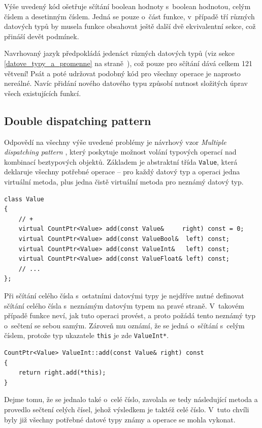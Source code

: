 \documentclass[11pt,twoside,a4paper]{book}
\begin{document}
Výše uvedený kód ošetřuje sčítání boolean hodnoty s~boolean hodnotou, celým číslem a desetinným číslem. Jedná se pouze o~část funkce, v~případě tří různých datových typů by musela funkce obsahovat ještě další dvě ekvivalentní sekce, což přináší devět podmínek.

Navrhovaný jazyk předpokládá jedenáct různých datových typů (viz sekce \ref{datove_typy_a_promenne} na straně~\pageref{datove_typy_a_promenne}), což pouze pro sčítání dává celkem 121 větvení! Psát a poté udržovat podobný kód pro všechny operace je naprosto nereálné. Navíc přidání nového datového typu způsobí nutnost slo\-ži\-tých úprav všech existujících funkcí.


\subsection{Double dispatching pattern}
\label{double_dispatching_pattern}

Odpovědí na všechny výše uvedené problémy je návrhový vzor \textit{Multiple dispatching pattern} \cite[str. 679]{eckel}, který poskytuje možnost volání typových operací nad kombinací beztypových objektů. Základem je abstraktní třída \texttt{Value}, která deklaruje všechny potřebné operace -- pro každý datový typ a operaci jedna virtuální metoda, plus jedna čistě virtuální metoda pro neznámý datový typ.

\begin{verbatim}
class Value
{
    // +
    virtual CountPtr<Value> add(const Value&     right) const = 0;
    virtual CountPtr<Value> add(const ValueBool&  left) const;
    virtual CountPtr<Value> add(const ValueInt&   left) const;
    virtual CountPtr<Value> add(const ValueFloat& left) const;
    // ...
};
\end{verbatim}

Při sčítání celého čísla s~ostatními datovými typy je nejdříve nutné definovat sčítání celého čísla s~neznámým datovým typem na pravé straně. V~takovém případě funkce neví, jak tuto operaci provést, a proto požádá tento neznámý typ o~sečtení se sebou samým. Zároveň mu oznámí, že se jedná o~sčítání s~celým číslem, protože typ ukazatele \texttt{this} je zde \texttt{ValueInt*}.

\begin{verbatim}
CountPtr<Value> ValueInt::add(const Value& right) const
{
    return right.add(*this);
}
\end{verbatim}

Dejme tomu, že se jednalo také o~celé číslo, zavolala se tedy následující metoda a provedlo sečtení celých čísel, jehož výsledkem je taktéž celé číslo. V~tuto chvíli byly již všechny potřebné datové typy známy a operace se mohla vykonat.
\end{document}
